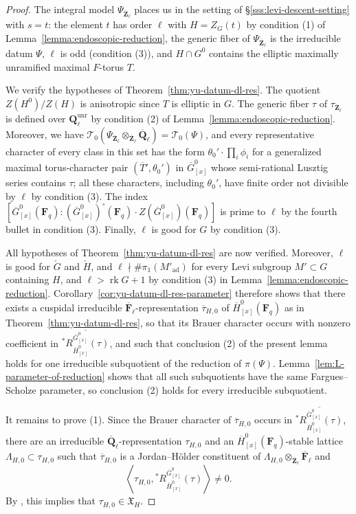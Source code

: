 \documentclass[reqno]{amsart}
\numberwithin{equation}{subsection}
\newcommand{\F}{\mathbf{F}}
\newcommand{\Q}{\mathbf{Q}}
\newcommand{\Z}{\mathbf{Z}}
\newcommand{\ol}[1]{\overline{#1}}
\newcommand\cT{\mathcal{T}}
\DeclareMathOperator{\ad}{ad}
\DeclareMathOperator{\unr}{unr}
\DeclareMathOperator{\rk}{rk}
\newcommand{\chG}{\check{G}}
\newcommand{\chH}{\check{H}}
\theoremstyle{remark}
\numberwithin{equation}{subsection}
\numberwithin{figure}{subsection}
\begin{document}
\begin{proof}
The integral model $\Psi_{\ol\Z_\ell}$ places us in the setting of \S\ref{sss:levi-descent-setting} with $s = t$: the element $t$ has order $\ell$ with $H = Z_G(t)$ by condition (1) of Lemma~\ref{lemma:endoscopic-reduction}, the generic fiber of $\Psi_{\ol\Z_\ell}$ is the irreducible datum $\Psi$, $\ell$ is odd (condition (3)), and $H \cap G^0$ contains the elliptic maximally unramified maximal $F$-torus $T$.

We verify the hypotheses of Theorem~\ref{thm:yu-datum-dl-res}. The quotient $Z(H^0)/Z(H)$ is anisotropic since $T$ is elliptic in $G$. The generic fiber $\tau$ of $\tau_{\ol\Z_\ell}$ is defined over $\Q_\ell^{\unr}$ by condition (2) of Lemma~\ref{lemma:endoscopic-reduction}. Moreover, we have $\cT_0(\Psi_{\ol\Z_\ell}\otimes_{\ol\Z_\ell}\ol\Q_\ell)=\cT_0(\Psi)$, and every representative character of every class in this set has the form $\theta_0' \cdot \prod_i \phi_i$ for a generalized maximal torus-character pair $(\ol T', \theta_0')$ in $\ol G^0_{[x]}$ whose semi-rational Lusztig series contains $\tau$; all these characters, including $\theta_0'$, have finite order not divisible by $\ell$ by condition (3). The index $[\ol G^0_{[x]}(\F_q): (\ol G^0_{[x]})^\circ(\F_q) \cdot Z(\ol G^0_{[x]})(\F_q)]$ is prime to $\ell$ by the fourth bullet in condition (3). Finally, $\ell$ is good for $G$ by condition (3).

All hypotheses of Theorem~\ref{thm:yu-datum-dl-res} are now verified. Moreover, $\ell$ is good for $\chG$ and $\chH$, and $\ell \nmid \#\pi_1(M'_{\ad})$ for every Levi subgroup $M' \subset G$ containing $H$, and $\ell > \rk G + 1$ by condition (3) in Lemma~\ref{lemma:endoscopic-reduction}. Corollary~\ref{cor:yu-datum-dl-res-parameter} therefore shows that there exists a cuspidal irreducible $\ol\F_\ell$-representation $\ol\tau_{H,0}$ of $\ol H^0_{[x]}(\F_q)$ as in Theorem~\ref{thm:yu-datum-dl-res}, so that its Brauer character occurs with nonzero coefficient in $\ol{{}^*R^{\ol G^0_{[x]}}_{\ol H^0_{[x]}}(\tau)}$, and such that conclusion (2) of the present lemma holds for one irreducible subquotient of the reduction of $\pi(\Psi)$. Lemma~\ref{lem:L-parameter-of-reduction} shows that all such subquotients have the same Fargues--Scholze parameter, so conclusion (2) holds for every irreducible subquotient.

It remains to prove (1). Since the Brauer character of $\ol\tau_{H,0}$ occurs in $\ol{{}^*R^{\ol G^0_{[x]}}_{\ol H^0_{[x]}}(\tau)}$, there are an irreducible $\ol\Q_\ell$-representation $\tau_{H,0}$ and an $\ol H^0_{[x]}(\F_q)$-stable lattice $\Lambda_{H,0}\subset\tau_{H,0}$ such that $\ol \tau_{H,0}$ is a Jordan--H\"older constituent of $\Lambda_{H,0}\otimes_{\ol\Z_\ell}\ol\F_\ell$ and
\[
\left\langle
\tau_{H,0},
{}^*R^{\ol G^0_{[x]}}_{\ol H^0_{[x]}}(\tau)
\right\rangle\neq 0.
\]
By \cite[Corollary~2.8.6]{Cot26b}, this implies that $\tau_{H,0}\in\mathfrak X_H$.
\end{proof}
\end{document}
